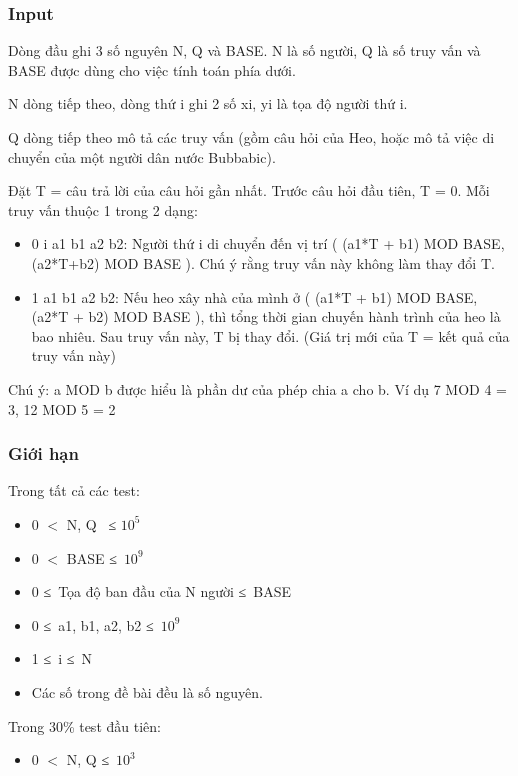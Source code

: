 \subsubsection{   Input  }

   Dòng đầu ghi 3 số nguyên N, Q và BASE. N là số người, Q là số truy vấn và BASE được dùng cho việc tính toán phía dưới.  

   N dòng tiếp theo, dòng thứ i ghi 2 số xi, yi là tọa độ người thứ i.  

   Q dòng tiếp theo mô tả các truy vấn (gồm câu hỏi của Heo, hoặc mô tả việc di chuyển của một người dân nước Bubbabic).  

   Đặt T = câu trả lời của câu hỏi gần nhất. Trước câu hỏi đầu tiên, T = 0. Mỗi truy vấn thuộc 1 trong 2 dạng:  
\begin{itemize}
	\item     0 i a1 b1 a2 b2: Người thứ i di chuyển đến vị trí ( (a1*T + b1) MOD BASE, (a2*T+b2) MOD BASE ). Chú ý rằng truy vấn này không làm thay đổi T.   
	\item     1 a1 b1 a2 b2: Nếu heo xây nhà của mình ở ( (a1*T + b1) MOD BASE, (a2*T + b2) MOD BASE ), thì tổng thời gian chuyến hành trình của heo là bao nhiêu. Sau truy vấn này, T bị thay đổi. (Giá trị mới của T = kết quả của truy vấn này)   
\end{itemize}

   Chú ý: a MOD b được hiểu là phần dư của phép chia a cho b. Ví dụ 7 MOD 4 = 3, 12 MOD 5 = 2  

\subsubsection{   Giới hạn  }

   Trong tất cả các test:  
\begin{itemize}
	\item     0 $<$ N, Q  ≤ $10^{5}$
	\item     0 $<$ BASE ≤ $10^{9}$
	\item     0 ≤ Tọa độ ban đầu của N người ≤ BASE   
	\item     0 ≤ a1, b1, a2, b2 ≤ $10^{9}$
	\item     1 ≤ i ≤ N   
	\item     Các số trong đề bài đều là số nguyên.   
\end{itemize}

   Trong 30\% test đầu tiên:  
\begin{itemize}
	\item     0 $<$ N, Q ≤ $10^{3}$
\end{itemize}

